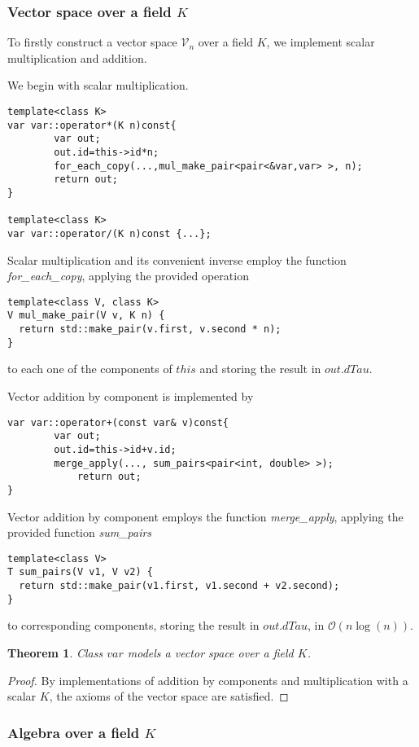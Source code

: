 \documentclass{article}
\newcommand{\VV}{\mathcal{V}}
\newtheorem{izrek}{Theorem}[section]
\begin{document}
\subsubsection{Vector space over a field $K$}
 
To firstly construct a vector space $\VV_n$ over a field $K$, we implement scalar multiplication and addition. 

We begin with scalar multiplication.

\begin{lstlisting}
template<class K>
var var::operator*(K n)const{
		var out;
        out.id=this->id*n;
        for_each_copy(...,mul_make_pair<pair<&var,var> >, n);
        return out;
}

template<class K>
var var::operator/(K n)const {...};
\end{lstlisting}
Scalar multiplication and its convenient inverse employ the function \emph{for\_each\_copy}, applying the provided operation 
\begin{lstlisting}
template<class V, class K>
V mul_make_pair(V v, K n) {
  return std::make_pair(v.first, v.second * n);
}
\end{lstlisting}
to each one of the components of $this$ and storing the result in $out.dTau$.

Vector addition by component is implemented by 
\begin{lstlisting}
var var::operator+(const var& v)const{
		var out;
        out.id=this->id+v.id;
        merge_apply(..., sum_pairs<pair<int, double> >);
            return out;
}
\end{lstlisting}
Vector addition by component employs the function \emph{merge\_apply}, applying the provided function \emph{sum\_pairs}
\begin{lstlisting}
template<class V>
T sum_pairs(V v1, V v2) {
  return std::make_pair(v1.first, v1.second + v2.second);
}
\end{lstlisting}
to corresponding components, storing the result in $out.dTau$, in $\mathcal{O}(n\log(n))$.

\begin{izrek}
Class $var$ models a vector space over a field $K$.
\end{izrek}
\begin{proof}
By implementations of addition by components and multiplication with a scalar $K$, the axioms of the vector space are satisfied.
\end{proof}

\subsubsection{Algebra over a field $K$}
\end{document}
